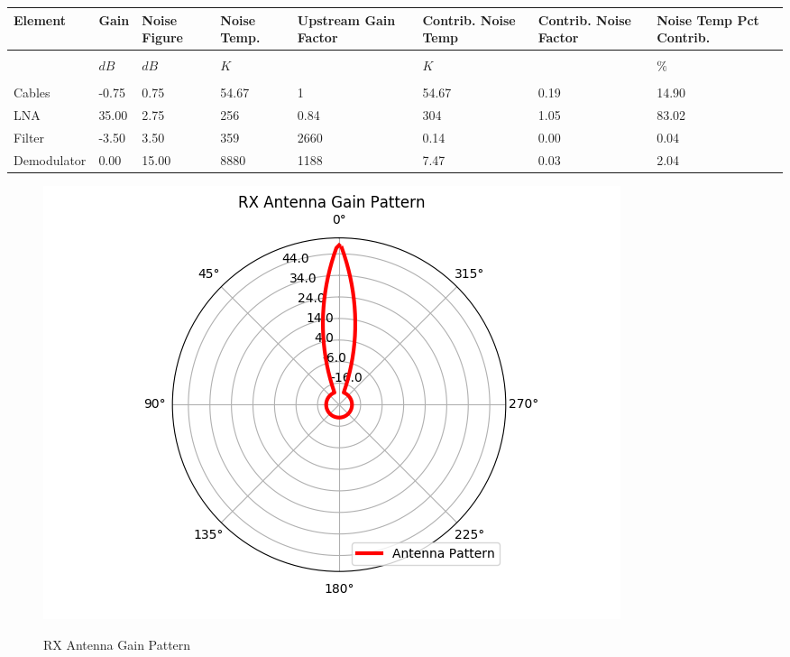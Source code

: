 \documentclass{article}
\begin{document}
\begin{center}
  \vspace{0.1in}
  \hspace*{-0.75in} \begin{tabular}{p{1.25in}p{0.47in}p{0.47in}p{0.5in}p{0.6in}p{0.5in}p{0.5in}p{0.75in}}
\textbf{Element} & \textbf{Gain} & \textbf{Noise Figure} & \textbf{Noise Temp.} & \textbf{Upstream Gain Factor} & \textbf{Contrib. Noise Temp} & \textbf{Contrib. Noise Factor} & \textbf{Noise Temp Pct Contrib.}\\
\hline \\
 & \textbf{$dB$} & \textbf{$dB$} & \textbf{$K$} &  & \textbf{$K$} &  & \textbf{$\%$}\\
\hline \\
Cables & -0.75 & 0.75 & 54.67 & 1 & 54.67 & 0.19 & 14.90\\
LNA & 35.00 & 2.75 & 256 & 0.84 & 304 & 1.05 & 83.02\\
Filter & -3.50 & 3.50 & 359 & 2660 & 0.14 & 0.00 & 0.04\\
Demodulator & 0.00 & 15.00 & 8880 & 1188 & 7.47 & 0.03 & 2.04\\
\end{tabular}
  \begin{figure}
    \caption{RX Antenna Gain Pattern}
    \includegraphics[width=\linewidth]{Ka_DownlinkRXPattern.png}
    \label{fig::pattern::rx}
  \end{figure}
\end{center}


\newpage
\end{document}
